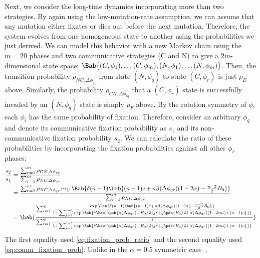 \documentclass[10pt,letterpaper]{article}
\begin{document}
Next, we consider the long-time dynamics incorporating more than two strategies.
By again using the low-mutation-rate assumption,
we can assume that any mutation either fixates
or dies out before the next mutation.
Therefore, the system evolves from one homogeneous state to another
using the probabilities we just derived.
We can model this behavior with a new Markov chain
using the $m=20$ phases and two communicative strategies (C and N)
to give a $2m$-dimensional state space:
$\Bab{(C,\phi_1), \ldots (C,\phi_m), (N,\phi_1), \ldots (N,\phi_m)}$.
Then, the transition probability $\rho_{NC,\Delta \phi_{qr}}$
from state $(N,\phi_q)$ to state $(C,\phi_r)$ is just $\rho_E$ above.
Similarly, the probability $\rho_{CN,\Delta \phi_{rq}}$
that a $(C,\phi_r)$ state is successfully invaded by
an $(N,\phi_q)$ state is simply $\rho_F$ above.
By the rotation symmetry of $\phi$, each $\phi_i$ has the same probability of fixation.
Therefore, consider an arbitrary $\phi_q$ and denote its communicative fixation probability as
$s_1$ and its non-communicative fixation probability $s_2$.
We can calculate the ratio of these probabilities
by incorporating the fixation probabilities against all other $\phi_r$ phases:
\begin{align}
  \frac{s_2}{s_1} &= \frac
    {\sum_{r=1}^{m} \rho_{CN,\Delta \phi_{rq}}}
    {\sum_{r=1}^{m} \rho_{NC,\Delta \phi_{qr}} }
  \\
  &=
  \frac
  {\sum_{r=1}^{m} \rho_{NC,\Delta \phi_{qr}}
    \exp \Bab{
      \delta (n-1)
      \bab{
        (n-1) c + n \beta(\Delta \phi_{qr}) (1 - 2 \alpha)
        - \frac{n-2}{2} B_0
      }
    }
  }
  {\sum_{r=1}^{m} \rho_{NC,\Delta \phi_{qr}}}
  \\
  &=
  \bab{
    \frac
    {\sum_{r=1}^{m} \frac
      {\exp \Bab{ \delta (n-1)
        \bab{
          (n-1) c + n \beta(\Delta \phi_{qr}) (1 - 2 \alpha) - \frac{n-2}{2} B_0
        }}
      }
      {1 + \sum_{j=1}^{n-1} \exp\Bab{
        \delta \bab{
         \pab{\beta(\Delta \phi_{qr}) - B_0/2} j^2
         + j \pab{B_0/2 + \beta(\Delta \phi_{qr}) (1 - 2 \alpha n) + (n-1) c}
        }}
      }
    }
    {\sum_{r=1}^{m} \frac{1}
      {1 + \sum_{j=1}^{n-1} \exp\Bab{
        \delta \bab{
         \pab{\beta(\Delta \phi_{qr}) - B_0/2} j^2
         + j \pab{B_0/2 + \beta(\Delta \phi_{qr}) (1 - 2 \alpha n) + (n-1) c}
        }}
      }
    }
  }
  \label{eq:full_analytic_frac}
\end{align}
The first equality used \cref{eq:fixation_prob_ratio}
and the second equality used \cref{eq:comm_fixation_prob}.
Unlike in the $\alpha = 0.5$ symmetric case~\cite{tripp2022evolutionary},
\end{document}
